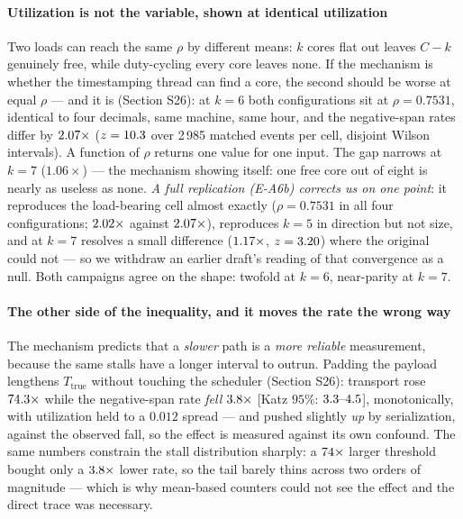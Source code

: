 \documentclass[10pt,journal,onecolumn]{IEEEtran}
\begin{document}
\paragraph{Utilization is not the variable, shown at identical utilization} Two loads can
reach the same $\rho$ by different means: $k$ cores flat out leaves $C-k$ genuinely free,
while duty-cycling every core leaves none. If the mechanism is whether the timestamping thread
can find a core, the second should be worse at equal $\rho$ --- and it is
(Section S26): at $k=6$ both configurations sit at $\rho = 0.7531$, identical to four
decimals, same machine, same hour, and the negative-span rates differ by $2.07\times$
($z=10.3$ over 2\,985 matched events per cell, disjoint Wilson intervals). A function of
$\rho$ returns one value for one input. The gap narrows at $k=7$ ($1.06\times$) --- the
mechanism showing itself: one free core out of eight is nearly as useless as none.
\emph{A full replication (E-A6b) corrects us on one point}: it reproduces the load-bearing
cell almost exactly ($\rho = 0.7531$ in all four configurations; $2.02\times$ against $2.07\times$),
reproduces $k=5$ in direction but not size, and at $k=7$ resolves a small difference
($1.17\times$, $z=3.20$) where the original could not --- so we withdraw an earlier draft's
reading of that convergence as a null. Both campaigns agree on the shape: twofold at $k=6$,
near-parity at $k=7$.

\paragraph{The other side of the inequality, and it moves the rate the wrong way} The
mechanism predicts that a \emph{slower} path is a \emph{more reliable} measurement, because
the same stalls have a longer interval to outrun. Padding the payload lengthens
$T_{\mathrm{true}}$ without touching the scheduler (Section S26): transport rose
$74.3\times$ while the negative-span rate \emph{fell} $3.8\times$
[Katz $95\%$: $\payloadRateFallCI$], monotonically, with
utilization held to a $0.012$ spread --- and pushed slightly \emph{up} by serialization,
against the observed fall, so the effect is measured against its own confound. The same
numbers constrain the stall distribution sharply: a $74\times$ larger threshold bought only a
$3.8\times$ lower rate, so the tail barely thins across two orders of magnitude --- which is
why mean-based counters could not see the effect and the direct trace was necessary.
\end{document}

